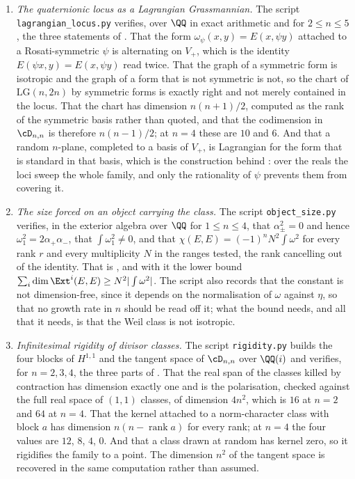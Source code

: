 \begin{enumerate}[label=\textup{(\Roman*)},leftmargin=*]
\item \emph{The quaternionic locus as a Lagrangian Grassmannian.} The script
  \texttt{lagrangian\_\allowbreak locus.py} verifies, over $\QQ$ in exact arithmetic and
  for $2\le n\le5$, the three statements of . That the
  form $\omega_{\psi}(x,y)=E(x,\psi y)$ attached to a Rosati-symmetric $\psi$
  is alternating on $V_{+}$, which is the identity $E(\psi x,y)=E(x,\psi y)$
  read twice. That the graph of a symmetric form is isotropic and the graph of
  a form that is not symmetric is not, so the chart of
  $\mathrm{LG}(n,2n)$ by symmetric forms is exactly right and not merely
  contained in the locus. That the chart has dimension $n(n+1)/2$, computed as
  the rank of the symmetric basis rather than quoted, and that the codimension
  in $\cD_{n,n}$ is therefore $n(n-1)/2$; at $n=4$ these are $10$ and $6$. And
  that a random $n$-plane, completed to a basis of $V_{+}$, is Lagrangian for
  the form that is standard in that basis, which is the construction behind
  : over the reals the loci sweep the whole family, and
  only the rationality of $\psi$ prevents them from covering it.

\item \emph{The size forced on an object carrying the class.} The script
  \texttt{object\_\allowbreak size.py} verifies, in the exterior algebra over $\QQ$ for
  $1\le n\le4$, that $\alpha_{\pm}^{2}=0$ and hence
  $\omega_{1}^{2}=2\alpha_{+}\alpha_{-}$, that $\int\omega_{1}^{2}\ne0$, and
  that $\chi(E,E)=(-1)^{n}N^{2}\int\omega^{2}$ for every rank $r$ and every
  multiplicity $N$ in the ranges tested, the rank cancelling out of the
  identity. That is , and with it the lower bound
  $\sum_{i}\dim\Ext^{i}(E,E)\ge N^{2}|\int\omega^{2}|$. The script also records
  that the constant is not dimension-free, since it depends on the
  normalisation of $\omega$ against $\eta$, so that no growth rate in $n$
  should be read off it; what the bound needs, and all that it needs, is that
  the Weil class is not isotropic.

\item \emph{Infinitesimal rigidity of divisor classes.} The script
  \texttt{rigidity.py} builds the four blocks of $H^{1,1}$ and the tangent
  space of $\cD_{n,n}$ over $\QQ(i)$ and verifies, for $n=2,3,4$, the three
  parts of . That the real span of the classes killed by
  contraction has dimension exactly one and is the polarisation, checked
  against the full real space of $(1,1)$ classes, of dimension $4n^{2}$,
  which is $16$ at $n=2$ and $64$ at $n=4$. That the kernel attached to a
  norm-character class with block $a$ has dimension $n(n-\operatorname{rank}a)$
  for every rank; at $n=4$ the four values are $12$, $8$, $4$, $0$. And that a
  class drawn at random has kernel zero, so it rigidifies the family to a
  point. The dimension $n^{2}$ of the tangent space is recovered in the same
  computation rather than assumed.


\end{enumerate}
